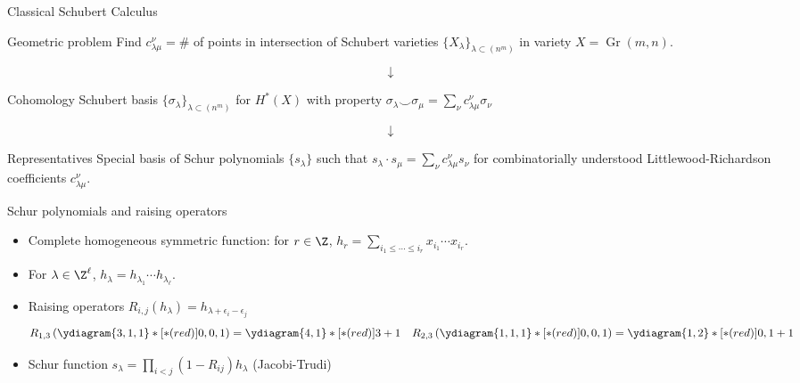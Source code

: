 \documentclass{beamer}
\DeclareMathOperator{\Gr}{Gr}
\newcommand{\cupprod}{\smile}
\theoremstyle{definition}
\begin{document}
\begin{frame}{Classical Schubert Calculus}
    \begin{block}{Geometric problem}
    Find \(c_{\lambda \mu}^\nu = \#\) of points in
    intersection of Schubert varieties \(\{X_\lambda\}_{\lambda
      \subset (n^m)}\) in variety \(X = \Gr(m,n)\). \pause
  \end{block}
  \vspace{-0.1in}
  \[
    \downarrow
  \]
  \vspace{-0.1in}
  \begin{block}{Cohomology}
    Schubert basis \(\{\sigma_\lambda\}_{\lambda \subset (n^m)}\) for
    \(H^*(X)\) with property \(\sigma_\lambda \cupprod \sigma_\mu = \sum_\nu c_{\lambda \mu}^\nu \sigma_\nu\) %
  \end{block}\pause
\vspace{-0.1in}  
\[
  \downarrow
\]
\vspace{-0.1in}
\begin{block}{Representatives}
  Special basis of Schur polynomials \(\{s_\lambda\}\) such that
  \(s_\lambda \cdot s_\mu = \sum_\nu c_{\lambda \mu}^\nu s_\nu\) for
  combinatorially understood Littlewood-Richardson coefficients \(c_{\lambda \mu}^\nu\).
\end{block}
\end{frame}
\begin{frame}{Schur polynomials and raising operators}
  \begin{itemize}
  \item Complete homogeneous symmetric function: for \(r \in \Z\), \(h_r = \sum_{i_1 \leq \cdots \leq i_r} x_{i_1}
    \cdots x_{i_r}\). \pause
  \item For \(\lambda \in \Z^\ell\), \(h_\lambda = h_{\lambda_1}
    \cdots h_{\lambda_\ell}\). \pause
  \item Raising operators
    \(R_{i,j}(h_\lambda) = h_{\lambda+\epsilon_i-\epsilon_j}\)
    \[
      R_{1,3} \left( \ydiagram{3,1,1}*[*(red)]{0,0,1} \right) =
      \ydiagram{4,1}*[*(red)]{3+1} \ \ \ R_{2,3} \left(
        \ydiagram{1,1,1}*[*(red)]{0,0,1} \right) =
      \ydiagram{1,2}*[*(red)]{0,1+1}
    \] \pause
  \item Schur function \(s_\lambda = \prod_{i < j} (1-R_{ij})h_\lambda\) (Jacobi-Trudi) 
  \end{itemize}
\end{frame}
\end{document}
